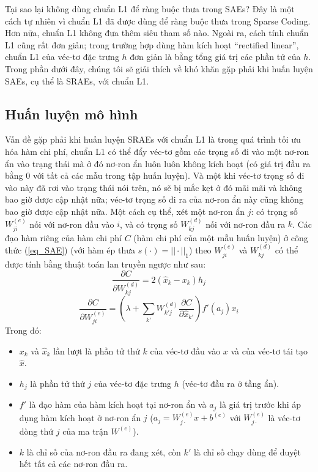 Tại sao lại không dùng chuẩn L1 để ràng buộc thưa trong SAEs? Đây là một cách tự nhiên vì chuẩn L1 đã được dùng để ràng buộc thưa trong Sparse Coding. Hơn nữa, chuẩn L1 không đưa thêm siêu tham số nào. Ngoài ra, cách tính chuẩn L1 cũng rất đơn giản; trong trường hợp dùng hàm kích hoạt ``rectified linear'', chuẩn L1 của véc-tơ đặc trưng $h$ đơn giản là bằng tổng giá trị các phần tử của $h$. Trong phần dưới đây, chúng tôi sẽ giải thích về khó khăn gặp phải khi huấn luyện SAEs, cụ thể là SRAEs, với chuẩn L1.
\subsection{Huấn luyện mô hình}
Vấn đề gặp phải khi huấn luyện SRAEs với chuẩn L1 là trong quá trình tối ưu hóa hàm chi phí, chuẩn L1 có thể đẩy véc-tơ gồm các trọng số đi vào một nơ-ron ẩn vào trạng thái mà ở đó nơ-ron ẩn luôn luôn không kích hoạt (có giá trị đầu ra bằng 0 với tất cả các mẫu trong tập huấn luyện). Và một khi véc-tơ trọng số đi vào này đã rơi vào trạng thái nói trên, nó sẽ bị mắc kẹt ở đó mãi mãi và không bao giờ được cập nhật nữa; véc-tơ trọng số đi ra của nơ-ron ẩn này cũng không bao giờ được cập nhật nữa. Một cách cụ thể, xét một nơ-ron ẩn $j$: có trọng số $W^{(e)}_{ji}$ nối với nơ-ron đầu vào $i$, và có trọng số $W^{(d)}_{kj}$ nối với nơ-ron đầu ra $k$. Các đạo hàm riêng của hàm chi phí $C$ (hàm chi phí của một mẫu huấn luyện) ở công thức (\ref{eq_SAE}) (với hàm ép thưa $s(\cdot)=||\cdot||_1$) theo $W^{(e)}_{ji}$ và $W^{(d)}_{kj}$ có thể được tính bằng thuật toán lan truyền ngược như sau:
\begin{equation}
	\frac{\partial C}{\partial W^{(d)}_{kj}} = 2(\hat{x}_k - x_k)h_j
	\label{eq_grad1_SAE}
\end{equation}
\begin{equation}
	\frac{\partial C}{\partial W^{(e)}_{ji}} = (\lambda + \sum_{k'} W^{(d)}_{k'j}\frac{\partial C}{\partial \hat{x}_{k'}})f'(a_j)x_i
	\label{eq_grad2_SAE}
\end{equation}
Trong đó:
\begin{itemize}
	\item $x_k$ và $\hat{x}_k$ lần lượt là phần tử thứ $k$ của véc-tơ đầu vào $x$ và của véc-tơ tái tạo $\hat{x}$.
	\item $h_j$ là phần tử thứ $j$ của véc-tơ đặc trưng $h$ (véc-tơ đầu ra ở tầng ẩn).
	\item $f'$ là đạo hàm của hàm kích hoạt tại nơ-ron ẩn và $a_j$ là giá trị trước khi áp dụng hàm kích hoạt ở nơ-ron ẩn $j$ ($a_j = W^{(e)}_{j\cdot}x + b^{(e)}$ với $W^{(e)}_{j\cdot}$ là véc-tơ dòng thứ $j$ của ma trận $W^{(e)}$).
	\item $k$ là chỉ số của nơ-ron đầu ra đang xét, còn $k'$ là chỉ số chạy dùng để duyệt hết tất cả các nơ-ron đầu ra.
\end{itemize}
